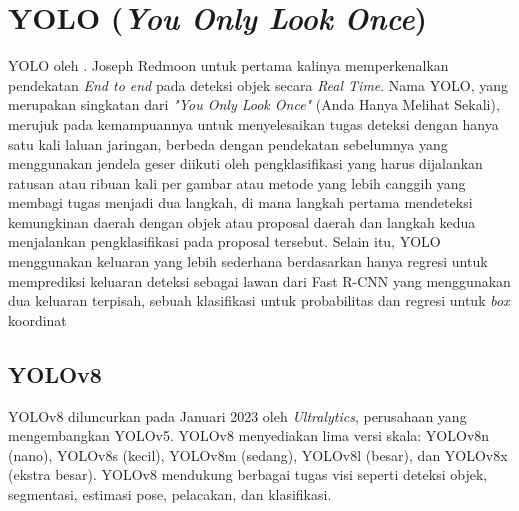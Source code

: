 \section{YOLO (\emph{You Only Look Once})}
YOLO oleh \cite{YOLO}. Joseph Redmoon untuk pertama kalinya memperkenalkan pendekatan \emph{End to end} pada deteksi objek secara \emph{Real Time}. Nama YOLO, yang merupakan singkatan dari \emph{"You Only Look Once"} (Anda Hanya Melihat Sekali), merujuk pada kemampuannya untuk menyelesaikan tugas deteksi dengan hanya satu kali laluan jaringan, berbeda dengan pendekatan sebelumnya yang menggunakan jendela geser diikuti oleh pengklasifikasi yang harus dijalankan ratusan atau ribuan kali per gambar atau metode yang lebih canggih yang membagi tugas menjadi dua langkah, di mana langkah pertama mendeteksi kemungkinan daerah dengan objek atau proposal daerah dan langkah kedua menjalankan pengklasifikasi pada proposal tersebut. Selain itu, YOLO menggunakan keluaran yang lebih sederhana berdasarkan hanya regresi untuk memprediksi keluaran deteksi sebagai lawan dari Fast R-CNN yang menggunakan dua keluaran terpisah, sebuah klasifikasi untuk probabilitas dan regresi untuk \emph{box} koordinat\parencite{YOLO}

\subsection{YOLOv8}
YOLOv8 diluncurkan pada Januari 2023 oleh \emph{Ultralytics}, perusahaan yang mengembangkan YOLOv5. YOLOv8 menyediakan lima versi skala: YOLOv8n (nano), YOLOv8s (kecil), YOLOv8m (sedang), YOLOv8l (besar), dan YOLOv8x (ekstra besar). YOLOv8 mendukung berbagai tugas visi seperti deteksi objek, segmentasi, estimasi pose, pelacakan, dan klasifikasi.\parencite{Yolov8}


